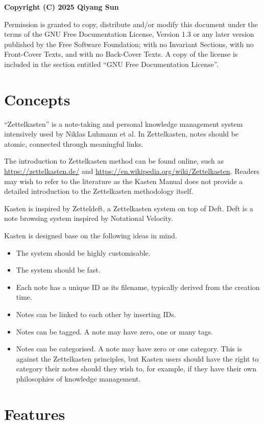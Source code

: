 \documentclass{book}
\renewcommand{\_}{\Texinfounderscore\discretionary{}{}{}}
\begin{document}
\textbf{Copyright (C) 2025 Qiyang Sun}

Permission is granted to copy, distribute and/or modify this document under the
terms of the GNU Free Documentation License, Version 1.3 or any later version
published by the Free Software Foundation; with no Invariant Sections, with no
Front-Cover Texts, and with no Back-Cover Texts.  A copy of the license is
included in the section entitled ``GNU Free Documentation License''.

\chapter{{Concepts}}
\label{anchor:Concepts}%

``Zettelkasten'' is a note-taking and personal knowledge management system
intensively used by Niklas Luhmann et al.  In Zettelkasten, notes should be
atomic, connected through meaningful links.

The introduction to Zettelkasten method can be found online, such as
\url{https://zettelkasten.de/} and \url{https://en.wikipedia.org/wiki/Zettelkasten}.
Readers may wish to refer to the literature as the Kasten Manual does not
provide a detailed introduction to the Zettelkasten methodology itself.

Kasten is inspired by Zetteldeft, a Zettelkasten system on top of Deft.  Deft is
a note browsing system inspired by Notational Velocity.

Kasten is designed base on the following ideas in mind.
\begin{itemize}
\item The system should be highly customisable.
\item The system should be fast.
\item Each note has a unique ID as its filename, typically derived from the creation
time.
\item Notes can be linked to each other by inserting IDs.
\item Notes can be tagged.  A note may have zero, one or many tags.
\item Notes can be categorised.  A note may have zero or one category.  This is
against the Zettelkasten principles, but Kasten users should have the right to
category their notes should they wish to, for example, if they have their own
philosophies of knowledge management.
\end{itemize}

\chapter{{Features}}
\label{anchor:Features}%
\end{document}
